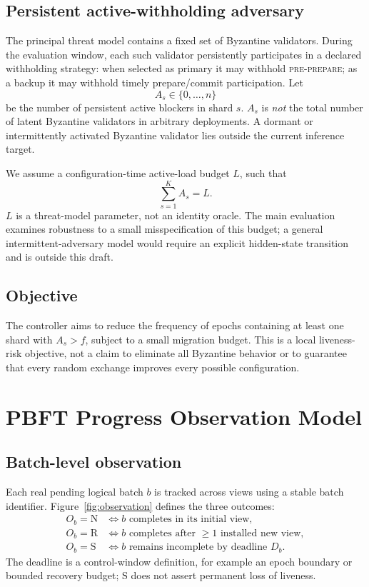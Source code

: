 \documentclass[10pt,conference]{IEEEtran}
\newcommand{\N}{\mathrm{N}}
\newcommand{\R}{\mathrm{R}}
\newcommand{\Sstall}{\mathrm{S}}
\begin{document}
\subsection{Persistent active-withholding adversary}

The principal threat model contains a fixed set of Byzantine validators. During the evaluation window, each such validator persistently participates in a declared withholding strategy: when selected as primary it may withhold \textsc{pre-prepare}; as a backup it may withhold timely prepare/commit participation. Let
\begin{equation}
A_s \in \{0,\ldots,n\}
\end{equation}
be the number of persistent active blockers in shard $s$. $A_s$ is \emph{not} the total number of latent Byzantine validators in arbitrary deployments. A dormant or intermittently activated Byzantine validator lies outside the current inference target.

We assume a configuration-time active-load budget $L$, such that
\begin{equation}
\sum_{s=1}^{K} A_s=L.
\end{equation}
$L$ is a threat-model parameter, not an identity oracle. The main evaluation examines robustness to a small misspecification of this budget; a general intermittent-adversary model would require an explicit hidden-state transition and is outside this draft.

\subsection{Objective}

The controller aims to reduce the frequency of epochs containing at least one shard with $A_s>f$, subject to a small migration budget. This is a local liveness-risk objective, not a claim to eliminate all Byzantine behavior or to guarantee that every random exchange improves every possible configuration.

\section{PBFT Progress Observation Model}

\subsection{Batch-level observation}

Each real pending logical batch $b$ is tracked across views using a stable batch identifier. Figure~\ref{fig:observation} defines the three outcomes:
\begin{align}
O_b=\N &\iff \text{$b$ completes in its initial view},\\
O_b=\R &\iff \text{$b$ completes after $\geq 1$ installed new view},\\
O_b=\Sstall &\iff \text{$b$ remains incomplete by deadline }D_b.
\end{align}
The deadline is a control-window definition, for example an epoch boundary or bounded recovery budget; $\Sstall$ does not assert permanent loss of liveness.
\end{document}
